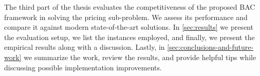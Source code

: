 The third part of the thesis evaluates the competitiveness of the proposed BAC framework
in solving the pricing sub-problem.
We assess its performance and compare it against modern state-of-the-art solutions.
In \cref{sec:results} we present the evaluation setup, we list the instances employed,
and finally, we present the empirical results along with a discussion.
Lastly, in \cref{sec:conclusions-and-future-work} we summarize the work, review the results,
and provide helpful tips while discussing possible implementation improvements.
